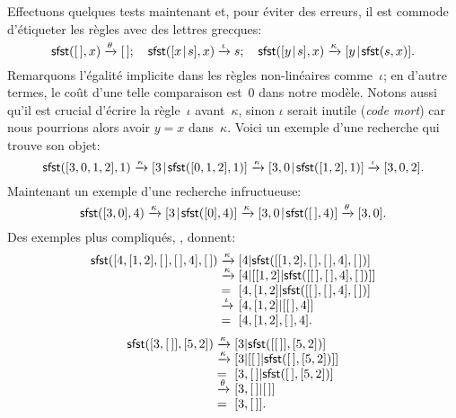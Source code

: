 Effectuons quelques tests maintenant et, pour éviter des erreurs, il
est commode d'étiqueter les règles avec des lettres grecques:
\begin{equation*}
\textsf{sfst}([\,],x)          \xrightarrow{\smash{\theta}} [\,];\quad
\textsf{sfst}([{x}\!\mid\!{s}],x)  \xrightarrow{\smash{\iota}}  s;\quad
\textsf{sfst}([{y}\!\mid\!{s}],x)  \xrightarrow{\smash{\kappa}}
[{y}\!\mid\!{\textsf{sfst}(s,x)}].
\end{equation*}
Remarquons l'égalité implicite dans les règles non-linéaires
comme~\(\iota\); en d'autre termes, le coût d'une telle comparaison
est~\(0\) dans notre modèle. Notons aussi qu'il est crucial d'écrire
la règle~\(\iota\) avant~\(\kappa\), sinon \(\iota\) serait inutile
(\emph{code mort}) car nous
pourrions alors avoir \(y = x\) dans~\(\kappa\). Voici un
exemple d'une recherche qui trouve son
objet:
\begin{equation*}
\textsf{sfst}([3,0,1,2],1) \xrightarrow{\smash{\kappa}}
[{3}\!\mid\!{\textsf{sfst}([0,1,2],1)}] \xrightarrow{\smash{\kappa}}
[{3,0}\!\mid\!{\textsf{sfst}([1,2],1)}] \xrightarrow{\smash{\iota}} [3,0,2].
\end{equation*}
Maintenant un exemple d'une recherche
infructueuse:
\begin{equation*}
\textsf{sfst}([3,0],4) \xrightarrow{\smash{\kappa}}
[{3}\!\mid\!{\textsf{sfst}([0],4)}] \xrightarrow{\smash{\kappa}}
[{3,0}\!\mid\!{\textsf{sfst}([\,],4)}] \xrightarrow{\smash{\theta}}
[3,0].
\end{equation*}
Des exemples plus compliqués, , donnent:
\begin{equation*}
\begin{array}{r@{\;}l@{\;}l}
\fun{sfst}([4,[1,2],\el,\el,4],\el)
& \smashedrightarrow{\kappa} &
  [4|\fun{sfst}([[1,2],\el,\el,4],\el)]\\
& \smashedrightarrow{\kappa} &
  [4|[[1,2]|\fun{sfst}([\el,\el,4],\el)]]\\
& = & [4,[1,2]|\fun{sfst}([\el,\el,4],\el)]\\
& \smashedrightarrow{\iota} & [4,[1,2]|[\el,4]]\\
& = & [4,[1,2],\el,4].
\end{array}
\end{equation*}
\begin{equation*}
\begin{array}{r@{\;}l@{\;}l}
\fun{sfst}([3,\el],[5,2])
& \smashedrightarrow{\kappa} & [3|\fun{sfst}([\el],[5,2])]\\
& \smashedrightarrow{\kappa} & [3|[\el|\fun{sfst}(\el,[5,2])]]\\
& = & [3,\el|\fun{sfst}(\el,[5,2])]\\
& \smashedrightarrow{\theta} & [3,\el|\el]\\
& = & [3,\el].
\end{array}
\end{equation*}
